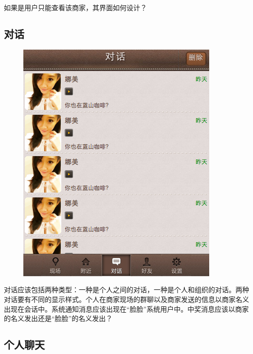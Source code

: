 \documentclass[cs4size]{ctexartutf8}
\begin{document}
如果是用户只能查看该商家，其界面如何设计？


\subsection{对话}

\begin{figure}[H]
\centering
\includegraphics[scale=0.5]{./6.png}
\end{figure}

对话应该包括两种类型：一种是个人之间的对话，一种是个人和组织的对话。两种对话要有不同的显示样式。个人在商家现场的群聊以及商家发送的信息以商家名义出现在会话中。系统通知消息应该出现在“脸脸”系统用户中。中奖消息应该以商家的名义发出还是“脸脸”的名义发出？


\subsection{个人聊天}
\end{document}
